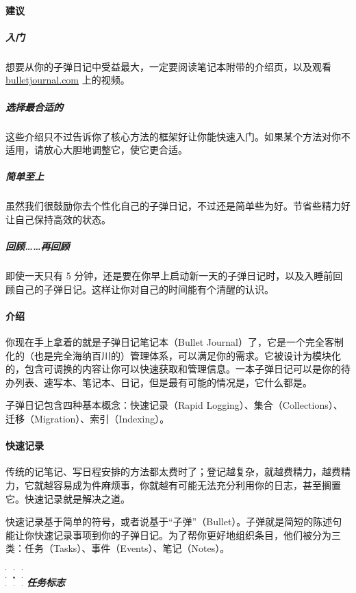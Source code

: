 \documentclass[a5paper]{article}
\begin{document}
\paragraph{建议}

\subparagraph{入门}

想要从你的子弹日记中受益最大，一定要阅读笔记本附带的介绍页，以及观看 \href{http://bulletjournal.com}{bulletjournal.com} 上的视频。

\subparagraph{选择最合适的}

这些介绍只不过告诉你了核心方法的框架好让你能快速入门。如果某个方法对你不适用，请放心大胆地调整它，使它更合适。

\subparagraph{简单至上}

虽然我们很鼓励你去个性化自己的子弹日记，不过还是简单些为好。节省些精力好让自己保持高效的状态。

\subparagraph{回顾……再回顾}

即使一天只有 5 分钟，还是要在你早上启动新一天的子弹日记时，以及入睡前回顾自己的子弹日记。这样让你对自己的时间能有个清醒的认识。

\clearpage

\paragraph{介绍}

你现在手上拿着的就是子弹日记笔记本（Bullet Journal）了，它是一个完全客制化的（也是完全海纳百川的）管理体系，可以满足你的需求。它被设计为模块化的，包含可调换的内容让你可以快速获取和管理信息。一本子弹日记可以是你的待办列表、速写本、笔记本、日记，但是最有可能的情况是，它什么都是。

子弹日记包含四种基本概念：快速记录（Rapid Logging）、集合（Collections）、迁移（Migration）、索引（Indexing）。

\clearpage

\paragraph{快速记录}

传统的记笔记、写日程安排的方法都太费时了；登记越复杂，就越费精力，越费精力，它就越容易成为件麻烦事，你就越有可能无法充分利用你的日志，甚至搁置它。快速记录就是解决之道。

快速记录基于简单的符号，或者说基于“子弹”（Bullet）。子弹就是简短的陈述句能让你快速记录事项到你的子弹日记。为了帮你更好地组织条目，他们被分为三类：任务（Tasks）、事件（Events）、笔记（Notes）。

\subparagraph{\protect\includegraphics[width=0.05\textwidth]{image/task.pdf} 任务标志}
\end{document}
